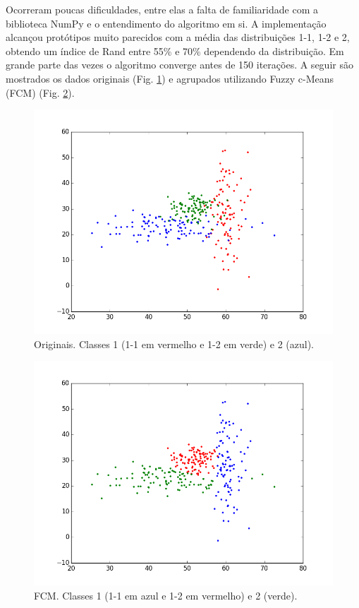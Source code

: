 \documentclass[12pt,twoside]{report}
\newcommand{\figureref}[1]{Fig. \ref{fig:#1}}
\newcommand{\captiontext}[1]{\footnotesize{#1}}
\begin{document}
Ocorreram poucas dificuldades, entre elas a falta de familiaridade com a biblioteca
NumPy e o entendimento do algoritmo em si. A implementação alcançou protótipos
muito parecidos com a média das distribuições 1-1, 1-2 e 2, obtendo um índice de
Rand entre 55\% e 70\% dependendo da distribuição. Em grande parte das vezes o
algoritmo converge antes de 150 iterações. A seguir são mostrados os dados originais
(\figureref{questao1_original}) e agrupados utilizando Fuzzy c-Means (FCM)
(\figureref{questao1_clusters}).

\begin{figure}[ht]
    \centering
    \includegraphics[scale=0.75]{questao1_original}
    \caption{\captiontext{Originais. Classes 1 (1-1 em vermelho e 1-2 em verde) e 2 (azul).}}
    \label{fig:questao1_original}
\end{figure}

\newpage

\begin{figure}[ht]
    \centering
    \includegraphics[scale=0.75]{questao1_clusters}
    \caption{\captiontext{FCM. Classes 1 (1-1 em azul e 1-2 em vermelho) e 2 (verde).}}
    \label{fig:questao1_clusters}
\end{figure}
\end{document}
